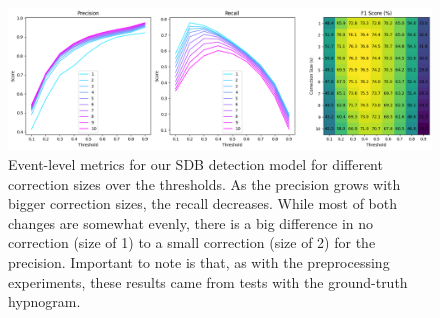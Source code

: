 \begin{figure}
    \centering
    \includegraphics[width=\textwidth]{images/CorSizeMetrics}
    \caption{Event-level metrics for our SDB detection model for different correction sizes over the thresholds. As the precision grows with bigger correction sizes, the recall decreases. While most of both changes are somewhat evenly, there is a big difference in no correction (size of 1) to a small correction (size of 2) for the precision. Important to note is that, as with the preprocessing experiments, these results came from tests with the ground-truth hypnogram.}
    \label{fig:correction-size}
\end{figure}
